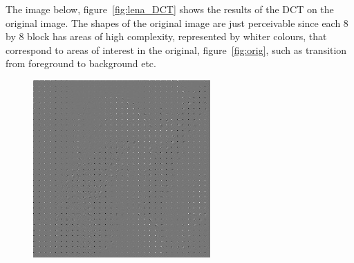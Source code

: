 		The image below, figure~\ref{fig:lena_DCT} shows the results of the DCT on the original image. The shapes of the original image are just perceivable since each 8 by 8 block has areas of high complexity, represented by whiter colours, that correspond to areas of interest in the original, figure~\ref{fig:orig}, such as transition from foreground to background etc.
		\begin{figure}[ht]
			\centering
			\begin{minipage}[c]{0.45\linewidth}
				\centering
			 	\includegraphics[width=\textwidth]{DCT_lena.jpg}
			\end{minipage}
			\begin{minipage}[c]{0.45\linewidth}
				\centering

\end{minipage}
\end{figure}
